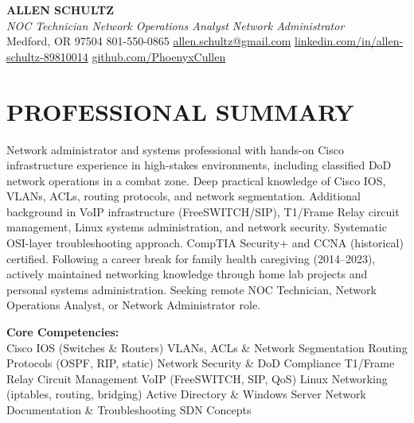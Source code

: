 \documentclass[9pt,letterpaper]{extarticle}
\begin{document}
\begin{center}
  {\LARGE\bfseries\color{accent} ALLEN SCHULTZ}\\[3pt]
  {\normalsize\itshape NOC Technician \textbar{} Network Operations Analyst \textbar{} Network Administrator}\\[4pt]
  {\small
    Medford, OR 97504 \textbar{} 801-550-0865 \textbar{}
    \href{mailto:allen.schultz@gmail.com}{allen.schultz@gmail.com} \textbar{}
    \href{https://linkedin.com/in/allen-schultz-89810014}{linkedin.com/in/allen-schultz-89810014} \textbar{}
    \href{https://github.com/PhoenyxCullen}{github.com/PhoenyxCullen}
  }
\end{center}
\vspace{-10pt}
\section*{PROFESSIONAL SUMMARY}

Network administrator and systems professional with hands-on Cisco infrastructure experience in high-stakes environments, including classified DoD network operations in a combat zone. Deep practical knowledge of Cisco IOS, VLANs, ACLs, routing protocols, and network segmentation. Additional background in VoIP infrastructure (FreeSWITCH/SIP), T1/Frame Relay circuit management, Linux systems administration, and network security. Systematic OSI-layer troubleshooting approach. CompTIA Security+ and CCNA (historical) certified. Following a career break for family health caregiving (2014--2023), actively maintained networking knowledge through home lab projects and personal systems administration. Seeking remote NOC Technician, Network Operations Analyst, or Network Administrator role.

\smallskip
\textbf{Core Competencies:}\\
Cisco IOS (Switches \& Routers) \textbullet{}
VLANs, ACLs \& Network Segmentation \textbullet{}
Routing Protocols (OSPF, RIP, static) \textbullet{}
Network Security \& DoD Compliance \textbullet{}
T1/Frame Relay Circuit Management \textbullet{}
VoIP (FreeSWITCH, SIP, QoS) \textbullet{}
Linux Networking (iptables, routing, bridging) \textbullet{}
Active Directory \& Windows Server \textbullet{}
Network Documentation \& Troubleshooting \textbullet{}
SDN Concepts

\end{document}
